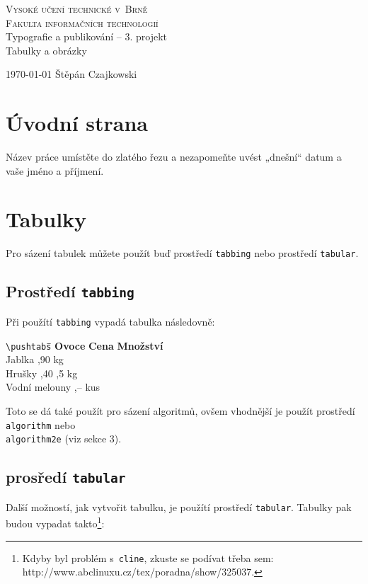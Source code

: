 \documentclass[a4paper,11pt]{article}
\begin{document}
\graphicspath{ {./etiopan.eps}{./oniisan.eps}{./oniisan2.eps} }


\begin{center}
\thispagestyle{empty}
\setcounter{page}{0}
\Huge
\textsc{Vysoké učení technické v~Brně \\ \huge Fakulta informačních technologií}\\
\huge Typografie a publikování -- 3. projekt \\
\Huge{Tabulky a obrázky}
\end{center}
{\large \today \hfill
Štěpán Czajkowski}
\newpage

\section{Úvodní strana}
Název práce umístěte do zlatého řezu a nezapomeňte uvést „dnešní“ datum a vaše jméno a příjmení.

\section{Tabulky}
Pro sázení tabulek můžete použít buď prostředí \texttt{tabbing} nebo prostředí \texttt{tabular}.

\subsection{Prostředí \texttt{tabbing}}
Při použítí \texttt{tabbing} vypadá tabulka následovně:

\begin{tabbing}
\verb|\pushtabs|\qquad \= \qquad \quad \= \kill
\textbf{Ovoce} \>\textbf{Cena} \>\textbf{Množství} \\
Jablka         ,90          kg              \\
Hrušky         ,40         ,5 kg            \\
Vodní melouny  ,--          kus

\end{tabbing}
Toto se dá také použít pro sázení algoritmů, ovšem vhodnější je použít prostředí \texttt{algorithm} nebo \\\texttt{algorithm2e} (viz sekce 3). 

\subsection{prosředí \texttt{tabular}}
Další možností, jak vytvořit tabulku, je použítí prostředí \texttt{tabular}. Tabulky pak budou vypadat takto\footnote{Kdyby byl problém s~\texttt{cline}, zkuste se podívat třeba sem: http://www.abclinuxu.cz/tex/poradna/show/325037.}:
\end{document}

